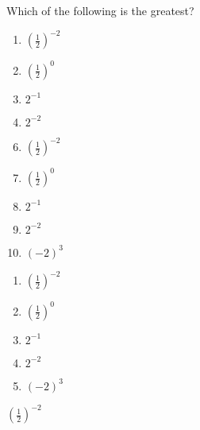 




 Which of the following is the greatest?


\ifsat
	\begin{enumerate}[label=\Alph*)]
		\item   $(\frac{1}{2})^{-2}$%
		\item  $(\frac{1}{2})^{0}$
		\item  $2^{-1}$
		\item  $2^{-2}$
	\end{enumerate}
\else
\fi

\ifacteven
	\begin{enumerate}[label=\textbf{\Alph*.},itemsep=\fill,align=left]
		\setcounter{enumii}{5}
		\item   $(\frac{1}{2})^{-2}$%
		\item  $(\frac{1}{2})^{0}$
		\item  $2^{-1}$
		\addtocounter{enumii}{1}
		\item  $2^{-2}$
		\item  $(-2)^{3}$
	\end{enumerate}
\else
\fi

\ifactodd
	\begin{enumerate}[label=\textbf{\Alph*.},itemsep=\fill,align=left]
		\item   $(\frac{1}{2})^{-2}$%
		\item  $(\frac{1}{2})^{0}$
		\item  $2^{-1}$
		\item  $2^{-2}$
		\item  $(-2)^{3}$
	\end{enumerate}
\else
\fi

\ifgridin
   $(\frac{1}{2})^{-2}$%
		
\else
\fi

